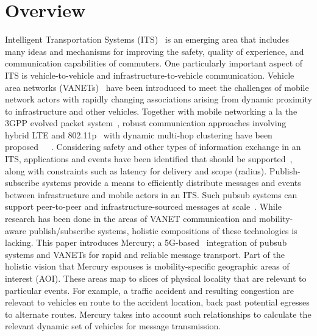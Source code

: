 \section*{Overview}

Intelligent Transportation Systems (ITS)~\cite{ITS} is an emerging
area that includes many ideas and mechanisms for improving the safety,
quality of experience, and communication capabilities of
commuters. One particularly important aspect of ITS is
vehicle-to-vehicle and infrastructure-to-vehicle
communication. Vehicle area networks (VANETs)~\cite{VANET} have been
introduced to meet the challenges of mobile network actors with
rapidly changing associations arising from dynamic proximity to
infrastructure and other vehicles. Together with mobile networking a
la the 3GPP evolved packet system~\cite{3GPP}, robust communication
approaches involving hybrid LTE and 802.11p~\cite{802.11p} with
dynamic multi-hop clustering have been
proposed~\cite{VMasC}~\cite{MDMAC}~\cite{NHop}. Considering safety and
other types of information exchange in an ITS, applications and events
have been identified that should be supported~\cite{vanet-apps}, along
with constraints such as latency for delivery and scope
(radius). Publish-subscribe systems provide a means to efficiently
distribute messages and events between infrastructure and mobile
actors in an ITS. Such pubsub systems can support peer-to-peer and
infrastructure-sourced messages at scale~\cite{MoPS-scaling}.  While
research has been done in the areas of VANET communication and
mobility-aware publish/subscribe systems, holistic compositions of
these technologies is lacking.  This paper introduces Mercury; a
5G-based~\cite{5G} integration of pubsub systems and VANETs for rapid
and reliable message transport.  Part of the holistic vision that
Mercury espouses is mobility-specific geographic areas of interest
(AOI). These areas map to slices of physical locality that are
relevant to particular events.  For example, a traffic accident and
resulting congestion are relevant to vehicles en route to the accident
location, back past potential egresses to alternate routes.  Mercury
takes into account such relationships to calculate the relevant dynamic
set of vehicles for message transmission.

